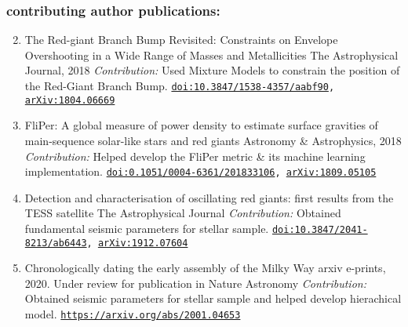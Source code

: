 \documentclass[letterpaper]{k-cv} %
\begin{document}
\subsubsection*{\color{c2}contributing author publications:}
\begin{enumerate}
	\setcounter{enumi}{1}
	\item {}
	{The Red-giant Branch Bump Revisited: Constraints on Envelope Overshooting in a Wide Range of Masses and Metallicities}
	{The Astrophysical Journal, 2018}
	{\textit{Contribution:} Used Mixture Models to constrain the position of the Red-Giant Branch Bump.}
	{\texttt{\href{https://iopscience.iop.org/article/10.3847/1538-4357/aabf90}{doi:10.3847/1538-4357/aabf90}, \href{https://arxiv.org/abs/1804.06669}{arXiv:1804.06669}}}

	\item {}
	{FliPer: A global measure of power density to estimate surface gravities of main-sequence solar-like stars and red giants}
	{Astronomy \& Astrophysics, 2018}
	{\textit{Contribution:} Helped develop the FliPer metric \& its machine learning implementation.}
	{\texttt{\href{https://www.aanda.org/articles/aa/abs/2018/12/aa33106-18/aa33106-18.html}{doi:0.1051/0004-6361/201833106}, \href{https://arxiv.org/abs/1809.05105}{arXiv:1809.05105}}}
	
	\item {}
	{Detection and characterisation of oscillating red giants: first results from the TESS satellite}
	{The Astrophysical Journal}
	{\bodyfont \textit{Contribution:} Obtained fundamental seismic parameters for stellar sample.}
	{\texttt{\href{https://iopscience.iop.org/article/10.3847/2041-8213/ab6443}{doi:10.3847/2041-8213/ab6443}, \href{https://arxiv.org/abs/1912.07604}{arXiv:1912.07604}}}
		
	\item {}
	{Chronologically dating the early assembly of the Milky Way}
	{arxiv e-prints, 2020. Under review for publication in Nature Astronomy}
	{\bodyfont \textit{Contribution:} Obtained seismic parameters for stellar sample and helped develop hierachical model.}
	{\texttt{\href{arxiv:2001.04653}{https://arxiv.org/abs/2001.04653}}}
		

\end{enumerate}
\end{document}
